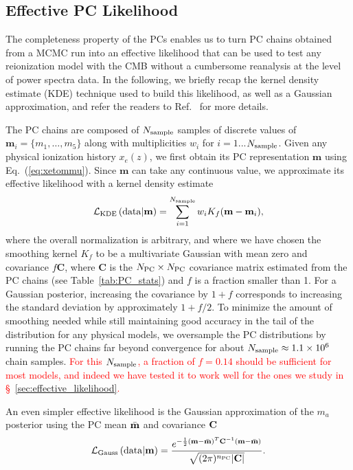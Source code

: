 \documentclass[prd,twocolumn,amsmath,amssymb,floatfix,superscriptaddress,nofootinbib]{revtex4-1}
\newcommand{\sample}{{\rm sample}}
\newcommand{\beq}{\begin{equation}}
\newcommand{\eeq}{\end{equation}}
\newcommand{\ch}[1]{\textcolor{red}{#1}}
\begin{document}
%
%
%
%

\subsection{Effective PC Likelihood}
\label{sec:KDE}
The completeness property of the PCs enables us to turn PC chains obtained from a MCMC run into an effective likelihood that can be used to test any reionization model with the CMB without a cumbersome reanalysis at the level of power spectra data. In the following, we briefly recap the kernel density estimate (KDE) technique used to build this likelihood, as well as a Gaussian approximation, and refer the readers to Ref.~\cite{Heinrich:2016ojb} for more details.

The PC chains are composed of $N_{\rm sample}$ samples of discrete values of $\mathbf{m}_i = \{m_1, \ldots, m_5\}$ along with multiplicities $w_i$ for $i = 1$...$N_{\rm sample}$. Given any physical ionization history $x_e(z)$, we first obtain its PC representation $\mathbf{m}$ using Eq.~(\ref{eq:xetommu}). Since $\mathbf{m}$ can take any continuous value, we approximate its effective likelihood with a kernel density estimate
\beq
{\cal L}_{\rm KDE}\left({\rm data}|\mathbf{m} \right)  = \sum_{i = 1}^{N_{\rm sample}} w_i K_f(\mathbf{m}-\mathbf{m}_i),
\eeq
where the overall normalization is arbitrary, and where we have chosen the smoothing kernel $K_f$ to be a  multivariate Gaussian with mean zero and covariance $f\mathbf{C}$, where $\mathbf{C}$ is the $N_{\rm PC} \times N_{\rm PC}$ covariance matrix estimated from the PC chains (see Table~\ref{tab:PC_stats}) and $f$ is a fraction smaller than 1.
For a Gaussian posterior, increasing the covariance by $1+f$ corresponds to increasing the standard deviation by approximately $1+f/2$. To minimize the amount of smoothing needed while still maintaining good accuracy in the tail of the distribution for any physical models, we oversample the PC distributions by running the PC chains far beyond convergence for about $N_{\sample} \approx 1.1 \times 10^{6}$ chain samples. 
\ch{For this $N_{\sample}$, a fraction of $f = 0.14$ should be sufficient for most models, and indeed we have tested it to work well for the ones we study in \S~\ref{sec:effective_likelihood}.} 

An even simpler effective likelihood is the Gaussian approximation of the $m_a$ posterior using the PC mean $\bar{\bf m}$ and covariance $\bf C$
%
\begin{equation}
 {\cal L}_{\rm Gauss}\left({\rm data}|\mathbf{m} \right) = \frac{ e^{-\frac{1}{2} ({\bf m}-\bar{\bf m})^T {\bf C}^{-1} ({\bf m}-\bar{\bf m}) } }{\sqrt{(2\pi)^{n_{\rm PC}} | \mathbf{C}| }}.
 \label{eq:gaussian}
 \end{equation}
%
\end{document}
